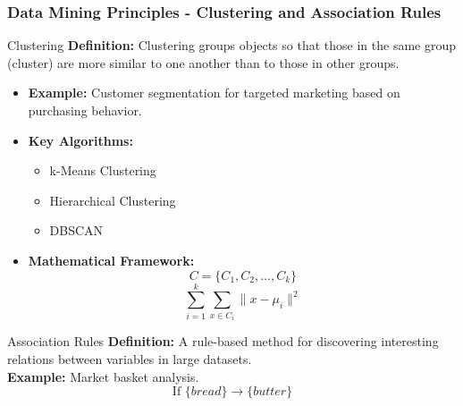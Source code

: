 \documentclass[aspectratio=169]{beamer}
\begin{document}
\begin{frame}[fragile]
    \frametitle{Data Mining Principles - Clustering and Association Rules}
    \begin{block}{Clustering}
        \textbf{Definition:} Clustering groups objects so that those in the same group (cluster) are more similar to one another than to those in other groups.
    \end{block}
    \begin{itemize}
        \item \textbf{Example:} Customer segmentation for targeted marketing based on purchasing behavior.
        
        \item \textbf{Key Algorithms:}
        \begin{itemize}
            \item k-Means Clustering
            \item Hierarchical Clustering
            \item DBSCAN
        \end{itemize}
        
        \item \textbf{Mathematical Framework:}
        \begin{equation}
            C = \{C_1, C_2, ..., C_k\}
        \end{equation}
        \begin{equation}
            \sum_{i=1}^{k} \sum_{x \in C_i} \| x - \mu_i \|^2
        \end{equation}
    \end{itemize}

    \begin{block}{Association Rules}
        \textbf{Definition:} A rule-based method for discovering interesting relations between variables in large datasets.
        \\
        \textbf{Example:} Market basket analysis.
        \begin{equation}
            \text{If } \{bread\} \rightarrow \{butter\}
        \end{equation}
    \end{block}
\end{frame}
\end{document}
